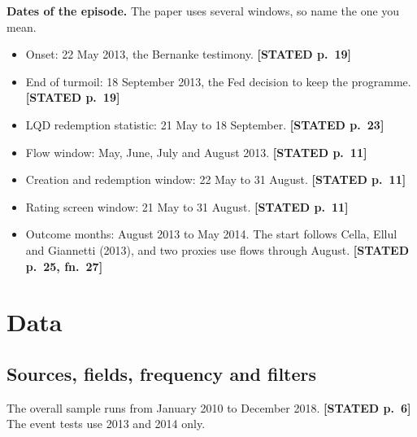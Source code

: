 \documentclass[10pt,a4paper]{article}
\newcommand{\ST}[1]{\textcolor{cst}{\textbf{[STATED #1]}}}
\begin{document}
\textbf{Dates of the episode.} The paper uses several windows, so name the one you mean.
\begin{itemize}
\item Onset: 22 May 2013, the Bernanke testimony. \ST{p.~19}
\item End of turmoil: 18 September 2013, the Fed decision to keep the programme. \ST{p.~19}
\item LQD redemption statistic: 21 May to 18 September. \ST{p.~23}
\item Flow window: May, June, July and August 2013. \ST{p.~11}
\item Creation and redemption window: 22 May to 31 August. \ST{p.~11}
\item Rating screen window: 21 May to 31 August. \ST{p.~11}
\item Outcome months: August 2013 to May 2014. The start follows Cella, Ellul and Giannetti (2013), and two proxies use flows through August. \ST{p.~25, fn.~27}
\end{itemize}

\section{Data}\label{sec:data}

\subsection{Sources, fields, frequency and filters}
The overall sample runs from January 2010 to December 2018. \ST{p.~6} The event tests use 2013 and 2014 only.
\end{document}
